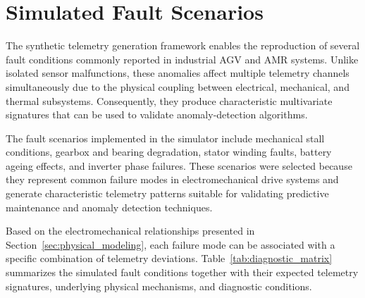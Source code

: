 \section{Simulated Fault Scenarios}
\label{sec:possible_anomalies}

The synthetic telemetry generation framework enables the reproduction of several fault conditions commonly reported in industrial AGV and AMR systems. Unlike isolated sensor malfunctions, these anomalies affect multiple telemetry channels simultaneously due to the physical coupling between electrical, mechanical, and thermal subsystems. Consequently, they produce characteristic multivariate signatures that can be used to validate anomaly-detection algorithms.

The fault scenarios implemented in the simulator include mechanical stall conditions, gearbox and bearing degradation, stator winding faults, battery ageing effects, and inverter phase failures. These scenarios were selected because they represent common failure modes in electromechanical drive systems and generate characteristic telemetry patterns suitable for validating predictive maintenance and anomaly detection techniques.

Based on the electromechanical relationships presented in Section~\ref{sec:physical_modeling}, each failure mode can be associated with a specific combination of telemetry deviations. Table~\ref{tab:diagnostic_matrix} summarizes the simulated fault conditions together with their expected telemetry signatures, underlying physical mechanisms, and diagnostic conditions.

